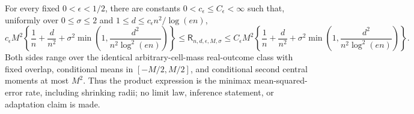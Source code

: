 For every fixed \(0<\epsilon<1/2\), there are constants \(0<c_{\epsilon}\le C_{\epsilon}<\infty\) such that, uniformly over \(0\le\sigma\le2\) and \(1\le d\le c_{\epsilon}n^2/\log(en)\),
\[
 c_{\epsilon}M^2\left\{
 \frac1n+\frac d{n^2}
 +\sigma^2\min\left(1,\frac{d^2}{n^2\log^2(en)}\right)
 \right\}
 \le\mathsf R_{n,d,\epsilon,M,\sigma}
 \le C_{\epsilon}M^2\left\{
 \frac1n+\frac d{n^2}
 +\sigma^2\min\left(1,\frac{d^2}{n^2\log^2(en)}\right)
 \right\}.
\]
Both sides range over the identical arbitrary-cell-mass real-outcome class with fixed overlap, conditional means in \([-M/2,M/2]\), and conditional second central moments at most \(M^2\).  Thus the product expression is the minimax mean-squared-error rate, including shrinking radii; no limit law, inference statement, or adaptation claim is made.